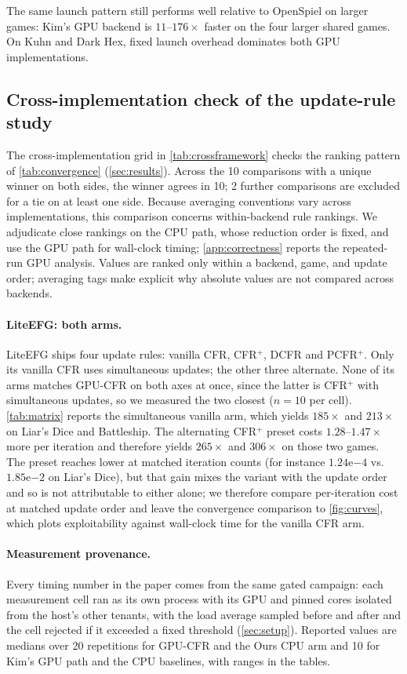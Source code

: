 The same launch pattern still performs well relative to OpenSpiel on larger games:
Kim's GPU backend is $11$--$176\times$ faster on the four larger shared games. On
Kuhn and Dark Hex, fixed launch overhead dominates both GPU implementations.

\subsection{Cross-implementation check of the update-rule study}
\label{sec:convergence}

The cross-implementation grid in \cref{tab:crossframework} checks the ranking pattern of
\cref{tab:convergence} (\cref{sec:results}).
Across the 10 comparisons with a unique winner on both sides, the winner agrees in 10;
2 further comparisons are excluded for a tie on at least one side. Because averaging
conventions vary across implementations, this comparison concerns within-backend rule
rankings. We adjudicate close rankings on the CPU path, whose reduction order is fixed,
and use the GPU path for wall-clock timing; \cref{app:correctness} reports the
repeated-run GPU analysis. Values are ranked only within a backend, game, and update
order; averaging tags make explicit why absolute values are not compared across
backends.



\paragraph{LiteEFG: both arms.}
LiteEFG ships four update rules: vanilla CFR, CFR$^{+}$, DCFR and PCFR$^{+}$. Only
its vanilla CFR uses simultaneous updates; the other three alternate. None of its arms
matches GPU-CFR on both axes at once, since the latter is CFR$^{+}$ with simultaneous
updates, so we measured the two closest ($n=10$ per cell). \cref{tab:matrix} reports the
simultaneous vanilla arm, which yields $185\times$ and $213\times$ on Liar's Dice and
Battleship. The alternating CFR$^{+}$ preset costs $1.28$--$1.47\times$ more per
iteration and therefore yields $265\times$ and $306\times$ on those two games. The preset reaches lower at matched iteration counts (for instance
$1.24\mathrm{e}{-4}$ vs.\ $1.85\mathrm{e}{-2}$ on Liar's Dice), but that gain mixes
the variant with the update order and so is not attributable to either alone; we
therefore compare per-iteration cost at matched update order and leave the
convergence comparison to \cref{fig:curves}, which plots exploitability against
wall-clock time for the vanilla CFR arm.

\paragraph{Measurement provenance.}
Every timing number in the paper comes from the same gated campaign: each
measurement cell ran as its own process with its GPU and pinned cores isolated from the
host's other tenants, with
the load average sampled before and after and the cell rejected if it exceeded a
fixed threshold (\cref{sec:setup}). Reported values are medians over 20
repetitions for GPU-CFR and the Ours CPU arm and 10 for Kim's GPU path and the CPU
baselines, with ranges in the tables.
